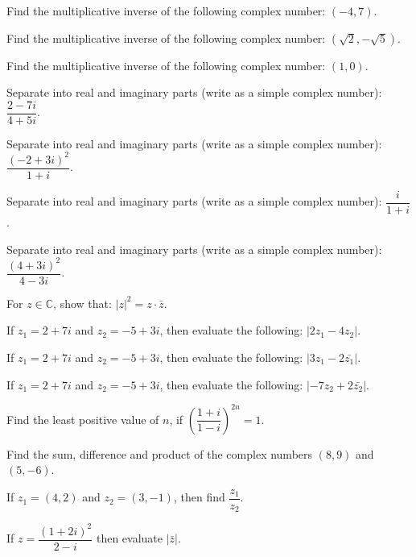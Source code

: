 \documentclass[11pt,a4paper]{article}
\begin{document}
\begin{shortlist}

\item Find the multiplicative inverse of the following complex number: $(-4,7)$.

\item Find the multiplicative inverse of the following complex number: $(\sqrt{2},-\sqrt{5})$.

\item Find the multiplicative inverse of the following complex number: $(1,0)$.

\item Separate into real and imaginary parts (write as a simple complex number): $\dfrac{2-7i}{4+5i}$.

\item Separate into real and imaginary parts (write as a simple complex number): $\dfrac{(-2+3i)^2}{1+i}$.

\item Separate into real and imaginary parts (write as a simple complex number): $\dfrac{i}{1+i}$.

\item Separate into real and imaginary parts (write as a simple complex number): $\dfrac{(4+3i)^2}{4-3i}$.

\item For $z\in\mathbb{C}$, show that: $|z|^2=z\cdot\bar{z}$.

\item If $z_1=2+7i$ and $z_2=-5+3i$, then evaluate the following: $|2z_1-4z_2|$.

\item If $z_1=2+7i$ and $z_2=-5+3i$, then evaluate the following: $|3z_1-2\bar{z_1}|$.

\item If $z_1=2+7i$ and $z_2=-5+3i$, then evaluate the following: $|-7z_2+2\bar{z_2}|$.

\item Find the least positive value of $n$, if $\left(\dfrac{1+i}{1-i}\right)^{2n}=1$.

\item Find the sum, difference and product of the complex numbers $(8,9)$ and $(5,-6)$.

\item If $z_1=(4,2)$ and $z_2=(3,-1)$, then find $\dfrac{z_1}{z_2}$.

\item If $z=\dfrac{(1+2i)^2}{2-i}$ then evaluate $|\bar{z}|$.


\end{shortlist}
\end{document}
